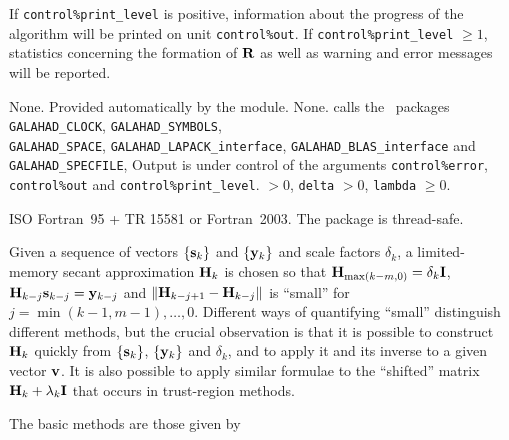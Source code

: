 \documentclass{galahad}
\newcommand{\packagename}{LMS}
\begin{document}

\galinfo
If {\tt control\%print\_level} is positive, information about the progress
of the algorithm will be printed on unit {\tt control\-\%out}.
If {\tt control\%print\_level} $\geq 1$, statistics concerning the
formation of ${\mathbf{R}}$
as well as warning and error messages will be reported.


\galgeneral

\galcommon None.
\galworkspace Provided automatically by the module.
\galroutines None.
\galmodules {\tt \packagename} calls the \galahad\ packages
{\tt GALAHAD\_CLOCK},
{\tt GALAHAD\_SY\-M\-BOLS}, \\
{\tt GALAHAD\-\_SPACE},
{\tt GALAHAD\_LAPACK\_interface},
{\tt GALAHAD\_BLAS\_interface} and
{\tt GALAHAD\_SPECFILE},
\galio Output is under control of the arguments
 {\tt control\%error}, {\tt control\%out} and {\tt control\%print\_level}.
 $> 0$, {\tt delta} $> 0$, {\tt lambda} $\geq 0$.

\galportability ISO Fortran~95 + TR 15581 or Fortran~2003.
The package is thread-safe.



\galmethod

Given a sequence of vectors $\{{\mathbf{s}}_k\}$ and $\{{\mathbf{y}}_k\}$ and scale factors
$\delta_k$, a limited-memory secant approximation ${\mathbf{H}}_k$ is chosen so that
${\mathbf{H}}_{\max(k-m,0)} = \delta_k {\mathbf{I}}$, ${\mathbf{H}}_{k-j} {\mathbf{s}}_{k-j} = {\mathbf{y}}_{k-j}$
and $\| {\mathbf{H}}_{k-j+1} - {\mathbf{H}}_{k-j}\|$ is ``small'' for
$j = \min(k-1,m-1), \ldots, 0$.
Different ways of quantifying ``small'' distinguish different methods,
but the crucial
observation is that it is possible to construct ${\mathbf{H}}_k$ quickly from
$\{{\mathbf{s}}_k\}$, $\{{\mathbf{y}}_k\}$ and $\delta_k$, and to apply it and its inverse
to a given vector ${\mathbf{v}}$. It is also possible to apply similar formulae
to the ``shifted'' matrix ${\mathbf{H}}_k + \lambda_k {\mathbf{I}}$ that occurs in
trust-region methods.
\vspace*{1mm}

\galreferences
\vspace*{1mm}

\noindent
The basic methods are those given by
\vspace*{1mm}
\end{document}

